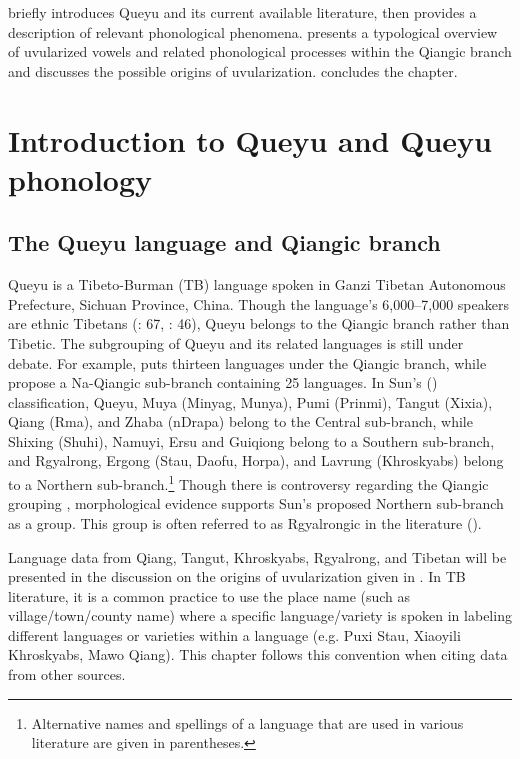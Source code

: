 \documentclass[output=paper]{langscibook}
\begin{document}
 briefly introduces Queyu and its current available literature, then provides a description of relevant phonological phenomena.  presents a typological overview of uvularized vowels and related phonological processes within the Qiangic branch and discusses the possible origins of uvularization.  concludes the chapter.

\section{Introduction to Queyu and Queyu phonology}\label{sec:guan:2}
\subsection{The Queyu language and Qiangic branch}\label{sec:guan:2.1}

Queyu is a Tibeto-Burman (TB) language spoken in Ganzi Tibetan Autonomous Prefecture, Sichuan Province, China. Though the language’s 6,000{--}7,000 speakers are ethnic Tibetans (\citealt{Lu1985}: 67, \citealt{Wang1991}: 46), Queyu belongs to the Qiangic branch rather than Tibetic. The subgrouping of Queyu and its related languages is still under debate. For example, \citet[4]{Sun2016} puts thirteen languages under the Qiangic branch, while \citet{JacquesMichaud2011} propose a Na-Qiangic sub-branch containing 25 languages. In Sun's (\citeyear{Sun2016}) classification, Queyu, Muya (Minyag, Munya), Pumi (Prinmi), Tangut (Xixia), Qiang (Rma), and Zhaba (nDra\-pa) belong to the Central sub-branch, while Shixing (Shuhi), Namuyi, Ersu and Gui\-qiong belong to a Southern sub-branch, and Rgyalrong, Ergong (Stau, Daofu, Horpa), and Lavrung (Khroskyabs) belong to a Northern sub-branch.\footnote{Alternative names and spellings of a language that are used in various literature are given in parentheses.} Though there is controversy regarding the Qiangic grouping \citep{Chirkova2012}, morphological evidence supports Sun’s proposed Northern sub-branch as a group. This group is often referred to as Rgyalrongic in the literature (\citealt{Sun2000a,Sun2000b}).

Language data from Qiang, Tangut, Khroskyabs, Rgyalrong, and Tibetan will be presented in the discussion on the origins of uvularization given in . In TB literature, it is a common practice to use the place name (such as village/town/county name) where a specific language/variety is spoken in labeling different languages or varieties within a language (e.g. Puxi Stau, Xiaoyili Khroskyabs, Mawo Qiang). This chapter follows this convention when citing data from other sources.
\end{document}
